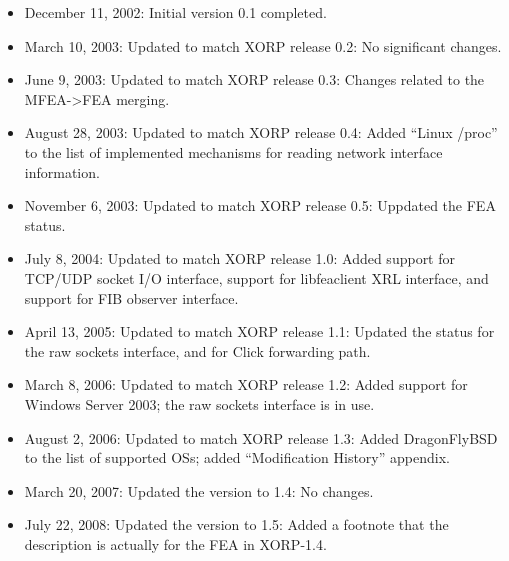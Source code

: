 \documentclass[11pt]{article}
\begin{document}
\begin{itemize}

  \item December 11, 2002: Initial version 0.1 completed.

  \item March 10, 2003: Updated to match XORP release 0.2:
   No significant changes.

  \item June 9, 2003: Updated to match XORP release 0.3:
   Changes related to the MFEA->FEA merging.

  \item August 28, 2003: Updated to match XORP release 0.4:
   Added ``Linux /proc'' to the list of implemented mechanisms for reading
   network interface information.

  \item November 6, 2003: Updated to match XORP release 0.5:
   Uppdated the FEA status.

  \item July 8, 2004: Updated to match XORP release 1.0:
   Added support for TCP/UDP socket I/O interface, support for
   libfeaclient XRL interface, and support for FIB observer interface.

  \item April 13, 2005: Updated to match XORP release 1.1:
   Updated the status for the raw sockets interface, and for Click
   forwarding path.

  \item March 8, 2006: Updated to match XORP release 1.2:
   Added support for Windows Server 2003; the raw sockets interface is
   in use.

  \item August 2, 2006: Updated to match XORP release 1.3:
   Added DragonFlyBSD to the list of supported OSs; added ``Modification
   History'' appendix.

  \item March 20, 2007: Updated the version to 1.4:
   No changes.

  \item July 22, 2008: Updated the version to 1.5:
   Added a footnote that the description is actually for the FEA in XORP-1.4.

\end{itemize}




\end{document}
